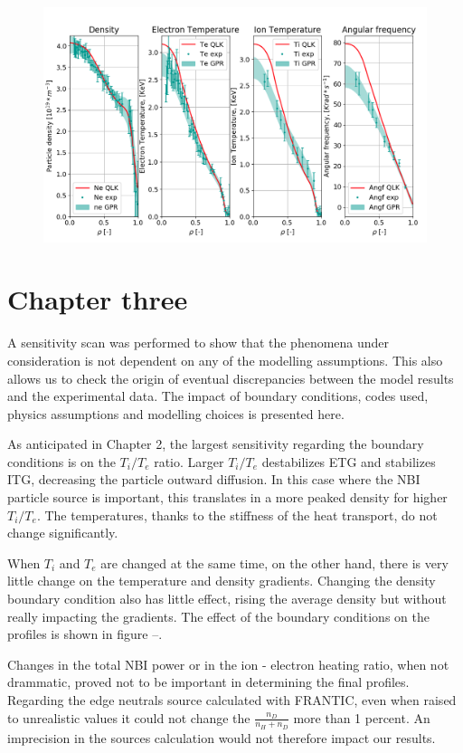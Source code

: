 \documentclass[a4paper,10pt]{iopart}
\begin{document}
\begin{figure}
	\centering
	\includegraphics[width=0.9\linewidth]{Plots/91227}
	\caption{}
	\label{fig:91227}
\end{figure}


\section{Chapter three}

A sensitivity scan was performed to show that the phenomena under consideration is not dependent on any of the modelling assumptions. This also allows us to check the origin of eventual discrepancies between the model results and the experimental data. The impact of boundary conditions, codes used, physics assumptions and modelling choices is presented here.

As anticipated in Chapter 2, the largest sensitivity regarding the boundary conditions is on the $ T_{i}/T_{e} $ ratio. Larger $ T_{i}/T_{e} $ destabilizes ETG and stabilizes ITG, decreasing the particle outward diffusion. In this case where the NBI particle source is important, this translates in a more peaked density for higher $ T_{i}/T_{e} $. The temperatures, thanks to the stiffness of the heat transport, do not change significantly. 

When $ T_{i} $ and $ T_{e} $ are changed at the same time, on the other hand, there is very little change on the temperature and density gradients. Changing the density boundary condition also has little effect, rising the average density but without really impacting the gradients. The effect of the boundary conditions on the profiles is shown in figure --.

Changes in the total NBI power or in the ion - electron heating ratio, when not drammatic, proved not to be important in determining the final profiles. Regarding the edge neutrals source calculated with FRANTIC, even when raised to unrealistic values it could not change the $ \frac{n_{D}}{n_{H} + n_{D}} $ more than 1 percent. An imprecision in the sources calculation would not therefore impact our results.
\end{document}
